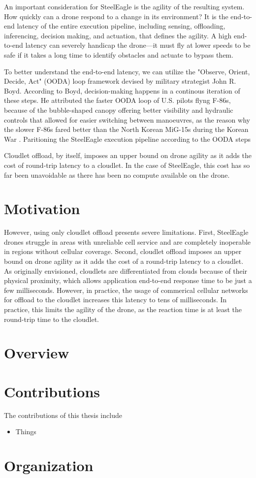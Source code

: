 An important consideration for SteelEagle is the agility of the resulting
system.  How quickly can a drone respond to a change in its environment? It is
the end-to-end latency of the entire execution pipeline, including sensing,
offloading, inferencing, decision making, and actuation, that defines the
agility. A high end-to-end latency can severely handicap the drone---it
must fly at lower speeds to be safe if it takes a long time to identify
obstacles and actuate to bypass them.

To better understand the end-to-end latency, we can utilize the "Observe,
Orient, Decide, Act" (OODA) loop framework devised by military strategist John
R. Boyd. According to Boyd, decision-making happens in a continous iteration of
these steps. He attributed the faster OODA loop of U.S. pilots flyng F-86s,
because of the bubble-shaped canopy offering better visibility and hydraulic
controls that allowed for easier switching between manoeuvres, as the reason
why the slower F-86s fared better than the North Korean MiG-15s during the
Korean War \cite{morton1995}. Paritioning the SteelEagle execution pipeline
according to the OODA steps


Cloudlet offload, by itself, imposes an
upper bound on drone agility as it adds the cost of round-trip latency to a
cloudlet. In the case of SteelEagle, this cost has so far been unavoidable
as there has been no compute available on the drone.

\section{Motivation}

However, using only cloudlet offload presents severe limitations. First,
SteelEagle drones struggle in areas with unreliable cell service and are
completely inoperable in regions without cellular coverage. Second, cloudlet
offload imposes an upper bound on drone agility as it adds the cost of a
round-trip latency to a cloudlet. As originally envisioned, cloudlets are
differentiated from clouds because of their physical proximity, which allows
application end-to-end response time to be just a few milliseconds. However,
in practice, the usage of commerical cellular networks for offload to the
cloudlet increases this latency to tens of milliseconds. In practice, this
limits the agility of the drone, as the reaction time is at least the round-trip
time to the cloudlet.

\section{Overview}


\section{Contributions}

The contributions of this thesis include
\begin{itemize}
  \item Things
\end{itemize}


\section{Organization}
